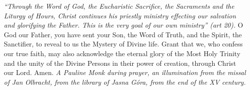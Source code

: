\pagestyle{empty}
\hspace{0pt}
\vfill

\textit{``Through the Word of God, the Eucharistic Sacrifice, the
Sacraments and the Liturgy of Hours, Christ continues his priestly
ministry effecting our salvation and glorifying the Father. This is
the very goal of our own ministry'' (art 20).}
\medbreak
O God our Father, you have sent your Son, the Word of
Truth, and the Spirit, the Sanctifier, to reveal to us the Mystery of
Divine life. Grant that we, who confess our true faith, may also
acknowledge the eternal glory of the Most Holy Trinity and the
unity of the Divine Persons in their power of creation, through
Christ our Lord. Amen.
\vfill
\textit{A Pauline Monk during prayer, an illumination from the missal of Jan Olbracht, from the library of Jasna Góra, from the end of the XV century.}
\hspace{0pt}
\newpage
